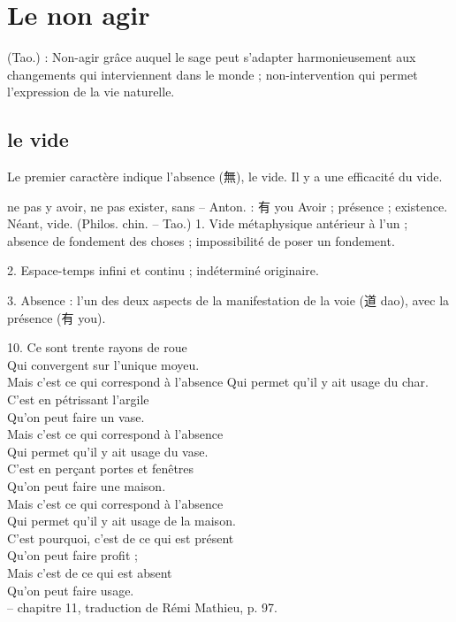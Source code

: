 \section{Le non agir}
\begin{Def}[wuwei 無為]
    (Tao.) : Non-agir grâce auquel le sage peut s’adapter harmonieusement aux changements qui interviennent dans le monde ; non-intervention qui permet l’expression de la vie naturelle.
\end{Def}


\subsection{le vide}
Le premier caractère indique l'absence (無), le vide. Il y a une efficacité du vide. 
\begin{Def}[wu無 ]
    ne pas y avoir, ne pas exister, sans – Anton. : 有 you Avoir ; présence ; existence. Néant, vide. (Philos. chin. – Tao.) 
    1. Vide métaphysique antérieur à l’un ; absence de fondement des choses ; impossibilité de poser un fondement. 
    
    2. Espace-temps infini et continu ; indéterminé originaire. 
    
    3. Absence : l’un des deux aspects de la manifestation de la voie (道 dao), avec la présence (有 you).
\end{Def}

\begin{singlequote}
    10.	Ce sont trente rayons de roue\\
Qui convergent sur l’unique moyeu. \\Mais c’est ce qui correspond à l’absence Qui permet qu’il y ait usage du char.\\
C’est en pétrissant l’argile \\Qu’on peut faire un vase.\\
Mais c’est ce qui correspond à l’absence \\Qui permet qu’il y ait usage du vase.\\
C’est en perçant portes et fenêtres \\Qu’on peut faire une maison.\\
Mais c’est ce qui correspond à l’absence \\Qui permet qu’il y ait usage de la maison.\\
 
C’est pourquoi, c’est de ce qui est présent \\Qu’on peut faire profit ;\\
Mais c’est de ce qui est absent\\ Qu’on peut faire usage.\\
-- chapitre 11, traduction de Rémi Mathieu, p. 97.
\end{singlequote}

